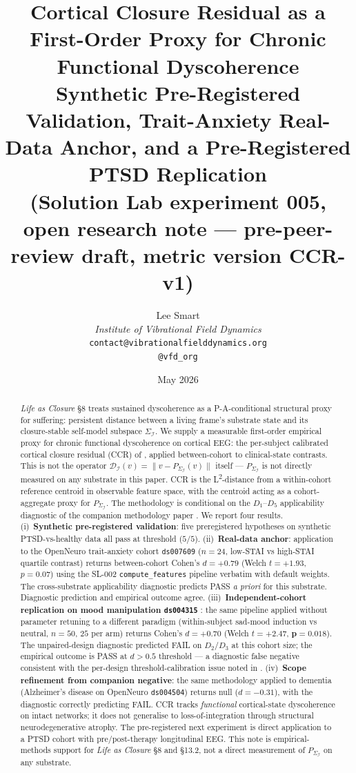 \documentclass[11pt,a4paper]{article}
\title{\textbf{Cortical Closure Residual as a First-Order Proxy for Chronic Functional Dyscoherence}\\[2pt]
\large Synthetic Pre-Registered Validation, Trait-Anxiety Real-Data Anchor, and a Pre-Registered PTSD Replication\\[1pt]
\small (Solution Lab experiment 005, open research note --- pre-peer-review draft, metric version CCR-v1)}
\author{%
  Lee Smart\\[4pt]
  \textit{Institute of Vibrational Field Dynamics}\\[2pt]
  \texttt{contact@vibrationalfielddynamics.org}\\[2pt]
  \texttt{@vfd\_org}%
}
\date{May 2026}
\begin{document}
\maketitle
\thispagestyle{empty}

\begin{abstract}
\noindent
\emph{Life as Closure} \citep{SmartLifeAsClosure} \S 8 treats sustained dyscoherence as a P-A-conditional structural proxy for suffering: persistent distance between a living frame's substrate state and its closure-stable self-model subspace $\Sigma_\mathcal{I}$. We supply a measurable first-order empirical proxy for chronic functional dyscoherence on cortical EEG: the per-subject calibrated cortical closure residual (CCR) of \citet{SolutionLab002}, applied between-cohort to clinical-state contrasts. This is not the operator $\mathcal{D}_\mathcal{I}(v) = \|v - P_{\Sigma_\mathcal{I}}(v)\|$ itself --- $P_{\Sigma_\mathcal{I}}$ is not directly measured on any substrate in this paper. CCR is the L\textsuperscript{2}-distance from a within-cohort reference centroid in observable feature space, with the centroid acting as a cohort-aggregate proxy for $P_{\Sigma_\mathcal{I}}$. The methodology is conditional on the $D_1$--$D_5$ applicability diagnostic of the companion methodology paper \citep{SmartClosureDistance}. We report four results. (i)~\textbf{Synthetic pre-registered validation}: five preregistered hypotheses on synthetic PTSD-vs-healthy data all pass at threshold ($5/5$). (ii)~\textbf{Real-data anchor}: application to the OpenNeuro trait-anxiety cohort \texttt{ds007609} \citep{ShalamberidzeAnxiety2025} ($n=24$, low-STAI vs high-STAI quartile contrast) returns between-cohort Cohen's $d = +0.79$ (Welch $t = +1.93$, $p = 0.07$) using the SL-002 \texttt{compute\_features} pipeline verbatim with default weights. The cross-substrate applicability diagnostic predicts PASS \emph{a priori} for this substrate. Diagnostic prediction and empirical outcome agree. (iii)~\textbf{Independent-cohort replication on mood manipulation \texttt{ds004315}} \citep{CavanaghMoodManipulation}: the same pipeline applied without parameter retuning to a different paradigm (within-subject sad-mood induction vs neutral, $n = 50$, $25$ per arm) returns Cohen's $d = +0.70$ (Welch $t = +2.47$, $\mathbf{p = 0.018}$). The unpaired-design diagnostic predicted FAIL on $D_2$/$D_3$ at this cohort size; the empirical outcome is PASS at $d > 0.5$ threshold --- a diagnostic false negative consistent with the per-design threshold-calibration issue noted in \citep{SmartClosureDistance}. (iv)~\textbf{Scope refinement from companion negative}: the same methodology applied to dementia (Alzheimer's disease on OpenNeuro \texttt{ds004504}) returns null ($d = -0.31$), with the diagnostic correctly predicting FAIL. CCR tracks \emph{functional} cortical-state dyscoherence on intact networks; it does not generalise to loss-of-integration through structural neurodegenerative atrophy. The pre-registered next experiment is direct application to a PTSD cohort with pre/post-therapy longitudinal EEG. This note is empirical-methods support for \emph{Life as Closure} \S 8 and \S 13.2, not a direct measurement of $P_{\Sigma_\mathcal{I}}$ on any substrate.
\end{abstract}
\end{document}
